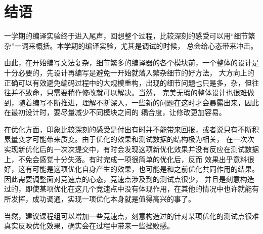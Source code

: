 \chapter{结语}
一学期的编译实验终于进入尾声，回想整个过程，比较深刻的感受可以用“细节繁杂”一词来概括。本学期的编译实验，尤其是调试的时候，
总会给心态带来冲击。

由此，在开始编写文法复杂，细节繁多的编译器的各个模块前，一个整体的设计是十分必要的，先设计再编写是避免一开始就落入繁杂细节的好方法，
大方向上的正确可以有效避免编码过程中的大规模重构，出现的细节问题也只是多，杂，但往往并不致命，只需要稍作修改就可以解决。当然，
完美无瑕的整体设计也很难做到，随着编写不断推进，理解不断深入，一些新的问题在这时才会暴露出来，因此在最初设计时，要尽量减少不同模块之间的
耦合度，让修改更加容易。

在优化方面，印象比较深刻的感受是付出有时并不能带来回报，或者说只有不断积累量变才可能带来质变。由于优化的效果和测试数据的结构极为相关，
在一次次实现新优化后的一次次提交中，有时会发现这项新优化效果并没有反应在测试数据上，不免会感觉十分失落。有时完成一项很简单的优化后，反而
效果出乎意料很好，这有可能是这项优化自身产生的效果，也可能是和之前优化共同作用的结果。因此需要调整面对竞速点的心态，竞速点涉及到的测试点很少，
并且是刻意构造过的，即使某项优化在这几个竞速点中没有体现作用，在其他的情况中也许就能有所发挥，成功调通，实现一项优化本身就是值得高兴的事了。

当然，建议课程组可以增加一些竞速点，刻意构造过的针对某项优化的测试点很难真实反映优化效果，确实会在过程中带来一些挫败感。